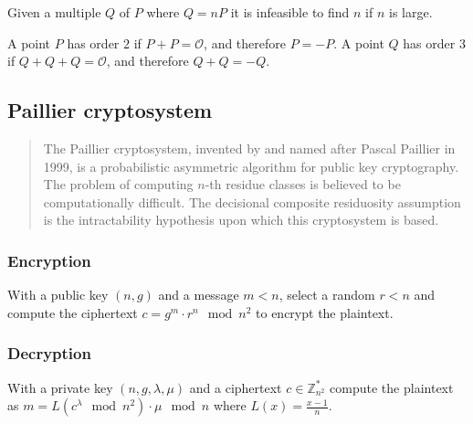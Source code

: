 

\begin{lemma}
  Given a multiple $Q$ of $P$ where $Q = nP$ it is infeasible to find $n$ if $n$ is
  large.
\end{lemma}

\begin{lemma}
  A point $P$ has order $2$ if $P + P = \mathcal{O}$, and therefore $P = -P$.
  A point $Q$ has order $3$ if $Q+Q+Q=\mathcal{O}$, and therefore $Q + Q = -Q$.
\end{lemma}


\subsection{Paillier cryptosystem}

\begin{quote}
  The Paillier cryptosystem, invented by and named after Pascal Paillier in 1999,
  is a probabilistic asymmetric algorithm for public key cryptography. The problem
  of computing $n$-th residue classes is believed to be computationally difficult.
  The decisional composite residuosity assumption is the intractability hypothesis
  upon which this cryptosystem is based.
\end{quote}

\subsubsection{Encryption}

With a public key $(n, g)$ and a message $m < n$, select a random $r < n$ and
compute the ciphertext $c = g^m \cdot r^n \mod n^2$ to encrypt the plaintext.

\subsubsection{Decryption}

With a private key $(n, g, \lambda, \mu)$ and a ciphertext $c \in \mathbb{Z}_{n^2}^*$
compute the plaintext as $m = L(c^{\lambda} \mod n^2) \cdot \mu \mod n$
where $L(x) = \frac{x-1}{n}$.

